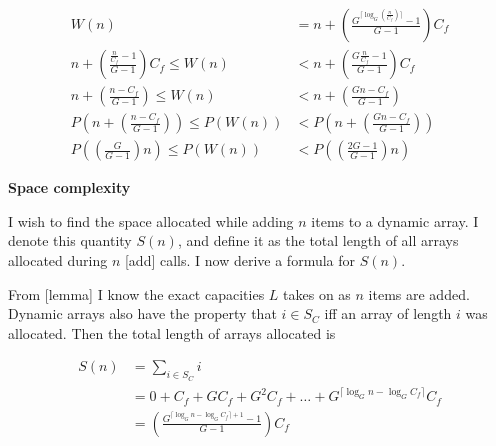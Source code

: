 \documentclass{article}
\newcommand{\scomplex}{\textbf{Space complexity}}
\newcommand{\spacefn}{S}
\newcommand{\nwritesfn}{W}
\newcommand{\biggo}{P}
\newcommand{\varnitems}{n}
\newcommand{\listname}{L}
\newcommand{\initcapacity}{C_f}
\newcommand{\growthfactor}{G}
\begin{document}
	\begin{align*}
	\nwritesfn(\varnitems) &= \varnitems + \left( \frac{\growthfactor^{\big\lceil \log_{\growthfactor} \left( \frac {\varnitems} {\initcapacity} \right) \big\rceil} - 1}{\growthfactor - 1} \right) \initcapacity\\
	\varnitems + \left( \frac{\frac{\varnitems}{\initcapacity} - 1}{\growthfactor - 1} \right) \initcapacity \leq \nwritesfn(\varnitems) &< \varnitems + \left( \frac{\growthfactor\frac{\varnitems}{\initcapacity} - 1}{\growthfactor - 1} \right) \initcapacity\\
	\varnitems + \left( \frac{\varnitems - \initcapacity}{\growthfactor - 1} \right) \leq \nwritesfn(\varnitems) &< \varnitems + \left( \frac{\growthfactor\varnitems - \initcapacity}{\growthfactor - 1} \right)\\
	\biggo\left( \varnitems + \left( \frac{\varnitems - \initcapacity}{\growthfactor - 1} \right) \right) \leq \biggo\left( \nwritesfn(\varnitems) \right) &< \biggo\left( \varnitems + \left( \frac{\growthfactor\varnitems - \initcapacity}{\growthfactor - 1} \right) \right)\\
	\biggo\left( \left( \frac{\growthfactor}{\growthfactor - 1} \right) \varnitems \right) \leq \biggo\left( \nwritesfn(\varnitems) \right) &< \biggo\left( \left( \frac{2\growthfactor - 1}{\growthfactor - 1} \right) \varnitems \right)
	\end{align*}
	
	\scomplex
	
	I wish to find the space allocated while adding $\varnitems$ items to a dynamic array. I denote this quantity $\spacefn(\varnitems)$, and define it as the total length of all arrays allocated during $\varnitems$ [add] calls. I now derive a formula for $\spacefn(\varnitems)$.
	
	From [lemma] I know the exact capacities $\listname$ takes on as $\varnitems$ items are added. Dynamic arrays also have the property that $i \in S_C$ iff an array of length $i$ was allocated. Then the total length of arrays allocated is
	
	\begin{align*}
	\spacefn(\varnitems) &= \sum_{i \in S_C} i\\
	&= 0 + \initcapacity + \growthfactor\initcapacity + \growthfactor^2\initcapacity + \ldots + \growthfactor^{\lceil \log_{\growthfactor} \varnitems - \log_{\growthfactor} \initcapacity \rceil}\initcapacity\\
	&= \left( \frac{\growthfactor^{\lceil \log_{\growthfactor} \varnitems - \log_{\growthfactor} \initcapacity \rceil + 1} - 1}{\growthfactor - 1} \right) \initcapacity
	\end{align*}
	
\end{document}
